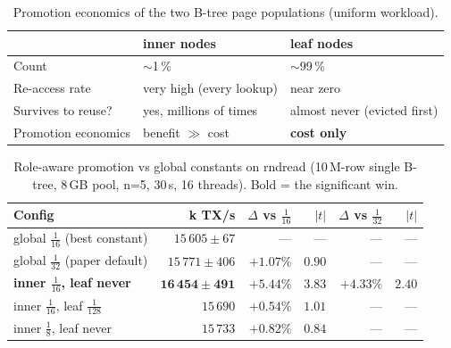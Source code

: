 \documentclass[10pt]{article}
\begin{document}
\begin{table}[h]
\centering\small
\caption{Promotion economics of the two B-tree page populations
  (uniform workload).}
\label{tab:econ}
\begin{tabular}{lll}
\toprule
 & \textbf{inner} nodes & \textbf{leaf} nodes \\
\midrule
Count                       & $\sim$1\,\%                 & $\sim$99\,\% \\
Re-access rate              & very high (every lookup)    & near zero \\
Survives to reuse?          & yes, millions of times      & almost never (evicted first) \\
Promotion economics         & benefit $\gg$ cost          & \textbf{cost only} \\
\bottomrule
\end{tabular}
\end{table}

\begin{table}[h]
\centering\small
\caption{Role-aware promotion vs global constants on rndread
  (10\,M-row single B-tree, 8\,GB pool, n=5, 30\,s, 16 threads).
  Bold = the significant win.}
\label{tab:perclass}
\begin{tabular}{lr rr rr}
\toprule
Config & k TX/s & $\Delta$ vs $\tfrac{1}{16}$ & $|t|$ & $\Delta$ vs $\tfrac{1}{32}$ & $|t|$ \\
\midrule
global $\tfrac{1}{16}$ (best constant)            & $15\,605\pm67$  & ---       & ---  & ---       & ---  \\
global $\tfrac{1}{32}$ (paper default)            & $15\,771\pm406$ & $+1.07\%$ & $0.90$ & ---     & ---  \\
\textbf{inner $\tfrac{1}{16}$, leaf never}        & $\mathbf{16\,454\pm491}$ & $\mathbf{+5.44\%}$ & $\mathbf{3.83}$ & $\mathbf{+4.33\%}$ & $\mathbf{2.40}$ \\
inner $\tfrac{1}{16}$, leaf $\tfrac{1}{128}$      & $15\,690$       & $+0.54\%$ & $1.01$ & ---     & ---  \\
inner $\tfrac{1}{8}$, leaf never                  & $15\,733$       & $+0.82\%$ & $0.84$ & ---     & ---  \\
\bottomrule
\end{tabular}
\end{table}
\end{document}
